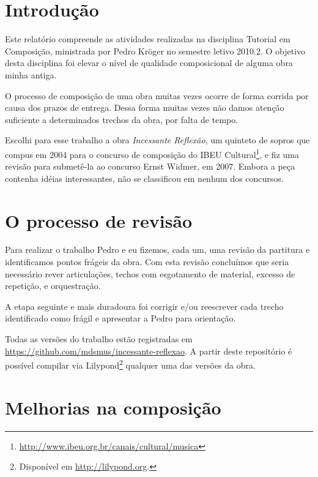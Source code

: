 \documentclass[10pt]{article}
\newcommand{\piece}[0]{\textit{Incessante Reflexão}}
\begin{document}

\section{Introdução}
\label{sec:introducao}

Este relatório compreende as atividades realizadas na disciplina
Tutorial em Composição, ministrada por Pedro Kröger no semestre letivo
2010.2.
O objetivo desta disciplina foi elevar o nível de qualidade
composicional de alguma obra minha antiga.

O processo de composição de uma obra muitas vezes ocorre de forma
corrida por causa dos prazos de entrega. Dessa forma muitas vezes não
damos atenção suficiente a determinados trechos da obra, por falta de
tempo.

Escolhi para esse trabalho a obra \piece{}, um quinteto de sopros que
compus em 2004 para o concurso de composição do IBEU
Cultural\footnote{\url{http://www.ibeu.org.br/canais/cultural/musica}},
e fiz uma revisão para submetê-la ao concurso Ernst Widmer, em
2007. Embora a peça contenha idéias interessantes, não se classificou
em nenhum dos concursos.

\section{O processo de revisão}
\label{sec:o-processo-de}

Para realizar o trabalho Pedro e eu fizemos, cada um, uma revisão da
partitura e identificamos pontos frágeis da obra. Com esta revisão
concluímos que seria necessário rever articulações, techos com
esgotamento de material, excesso de repetição, e orquestração.

A etapa seguinte e mais duradoura foi corrigir e/ou reescrever cada
trecho identificado como frágil e apresentar a Pedro para orientação.

Todas as versões do trabalho estão registradas em
\url{https://github.com/mdsmus/incessante-reflexao}. A partir deste
repositório é possível compilar via Lilypond\footnote{Disponível em
  \url{http://lilypond.org}.} qualquer uma das versões da obra.

\section{Melhorias na composição}
\label{sec:melh-na-comp}
\end{document}
